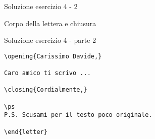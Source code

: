 \begin{frame}[fragile]{Soluzione esercizio 4 - 2}

Corpo della lettera e chiusura
\begin{block}{Soluzione esercizio 4 - parte 2}
\begin{lstlisting}
\opening{Carissimo Davide,}

Caro amico ti scrivo ...

\closing{Cordialmente,}

\ps
P.S. Scusami per il testo poco originale.

\end{letter}


\end{lstlisting}
\end{block}

\end{frame}